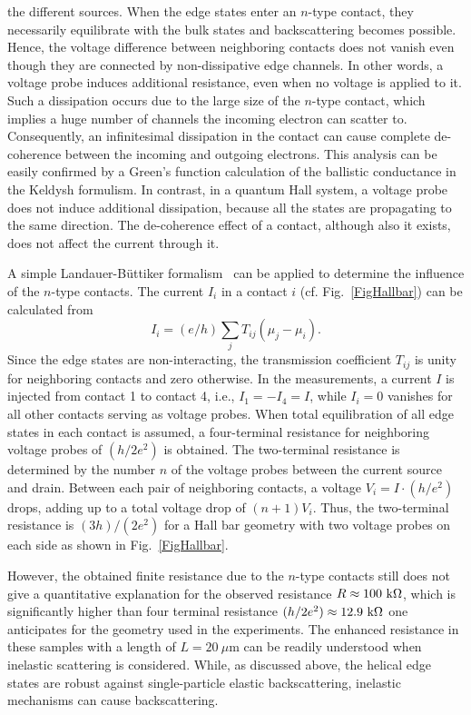 \documentclass{article}
\begin{document}
the different sources. When the edge states enter an $n$-type
contact, they necessarily equilibrate with the bulk states and
backscattering becomes possible. Hence, the voltage difference
between neighboring contacts does not vanish even though they are
connected by non-dissipative edge channels. In other words, a
voltage probe induces additional resistance, even when no voltage is
applied to it. Such a dissipation occurs due to the large size of
the $n$-type contact, which implies a huge number of channels the
incoming electron can scatter to. Consequently, an infinitesimal
dissipation in the contact can cause complete de-coherence between
the incoming and outgoing electrons. This analysis can be easily
confirmed by a Green's function calculation of the ballistic
conductance in the Keldysh formulism. In contrast, in a quantum Hall
system, a voltage probe does not induce additional dissipation,
because all the states are propagating to the same direction. The
de-coherence effect of a contact, although also it exists, does not
affect the current through it.

A simple Landauer-B{\"u}ttiker formalism~\cite{Buttiker86} can be
applied to determine the influence of the $n$-type contacts. The
current $I_i$ in a contact $i$ (cf. Fig.~\ref{FigHallbar}) can be
calculated from
$$I_i=(e/h)\sum_{j}T_{ij}(\mu_j-\mu_i).$$ Since the edge states are
non-interacting, the transmission coefficient $T_{ij}$ is unity for
neighboring contacts and zero otherwise. In the measurements, a
current $I$ is injected from contact 1 to contact 4, i.e.,
$I_1=-I_4=I$, while $I_i=0$ vanishes for all other contacts serving
as voltage probes. When total equilibration of all edge states in
each contact is assumed, a four-terminal resistance for neighboring
voltage probes of $(h/2e^2)$ is obtained. The two-terminal
resistance is determined by the number $n$ of the voltage probes
between the current source and drain. Between each pair of
neighboring contacts, a voltage $V_i=I\cdot(h/e^2)$ drops, adding up
to a total voltage drop of $(n+1)V_i$. Thus, the two-terminal
resistance is $(3h)/(2e^2)$ for a Hall bar geometry with two voltage
probes on each side as shown in Fig.~\ref{FigHallbar}.

However, the obtained finite resistance due to the $n$-type contacts
still does not give a quantitative explanation for the observed
resistance $R\approx100~{\rm k}\Omega$, which is significantly
higher than four terminal resistance $(h/2e^2) \approx 12.9~{\rm
k}\Omega$ one anticipates for the geometry used in the experiments.
The enhanced resistance in these samples with a length of
$L=20~\mu$m can be readily understood when inelastic scattering is
considered. While, as discussed above, the helical edge states are
robust against single-particle elastic backscattering, inelastic
mechanisms can cause backscattering.
\end{document}
